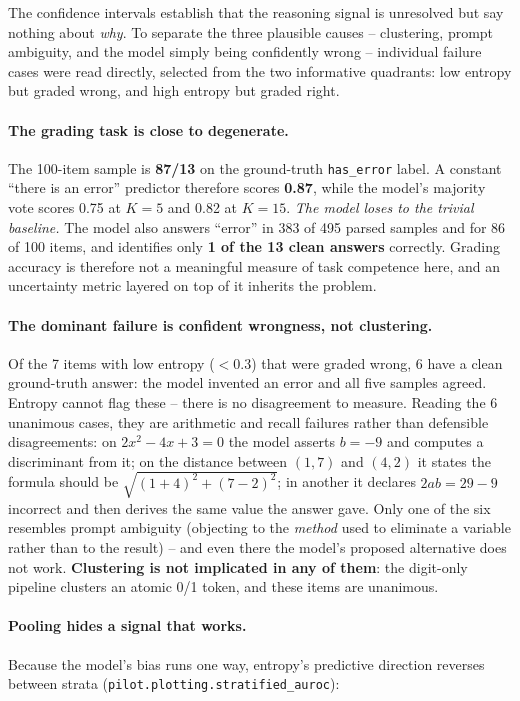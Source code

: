 \documentclass[11pt]{article}
\begin{document}
The confidence intervals establish that the reasoning signal is unresolved but
say nothing about \emph{why}. To separate the three plausible causes --
clustering, prompt ambiguity, and the model simply being confidently wrong --
individual failure cases were read directly, selected from the two informative
quadrants: low entropy but graded wrong, and high entropy but graded right.

\paragraph{The grading task is close to degenerate.} The 100-item sample is
\textbf{87/13} on the ground-truth \verb|has_error| label. A constant ``there
is an error'' predictor therefore scores \textbf{0.87}, while the model's
majority vote scores 0.75 at $K=5$ and 0.82 at $K=15$. \emph{The model loses to
the trivial baseline.} The model also answers ``error'' in 383 of 495 parsed
samples and for 86 of 100 items, and identifies only \textbf{1 of the 13 clean
answers} correctly. Grading accuracy is therefore not a meaningful measure of
task competence here, and an uncertainty metric layered on top of it inherits
the problem.

\paragraph{The dominant failure is confident wrongness, not clustering.} Of the
7 items with low entropy ($<0.3$) that were graded wrong, 6 have a clean
ground-truth answer: the model invented an error and all five samples agreed.
Entropy cannot flag these -- there is no disagreement to measure. Reading the
6 unanimous cases, they are arithmetic and recall failures rather than
defensible disagreements: on $2x^2 - 4x + 3 = 0$ the model asserts $b = -9$
and computes a discriminant from it; on the distance between $(1,7)$ and
$(4,2)$ it states the formula should be $\sqrt{(1+4)^2 + (7-2)^2}$; in another
it declares $2ab = 29 - 9$ incorrect and then derives the same value the
answer gave. Only one of the six resembles prompt ambiguity (objecting to the
\emph{method} used to eliminate a variable rather than to the result) -- and
even there the model's proposed alternative does not work. \textbf{Clustering
is not implicated in any of them}: the digit-only pipeline clusters an atomic
0/1 token, and these items are unanimous.

\paragraph{Pooling hides a signal that works.} Because the model's bias runs
one way, entropy's predictive direction reverses between strata
(\texttt{pilot.plotting.stratified\_auroc}):
\end{document}
